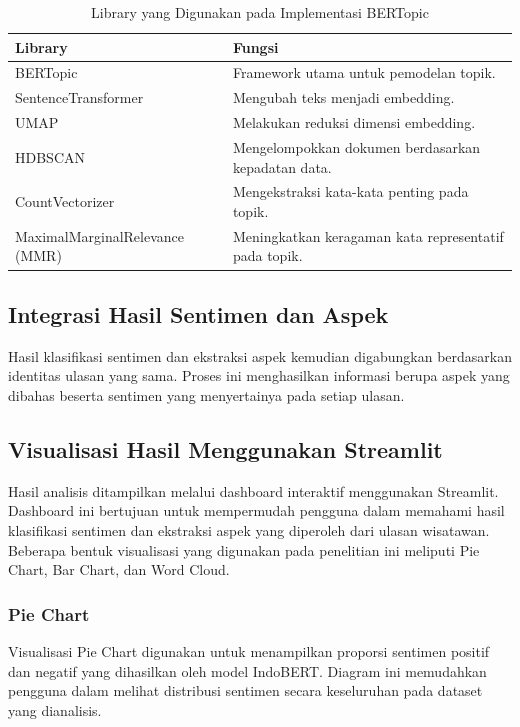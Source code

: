 \begin{table}[H]
\centering
\caption{Library yang Digunakan pada Implementasi BERTopic}
\begin{tabular}{|l|p{9cm}|}
\hline
\textbf{Library} & \textbf{Fungsi} \\
\hline
BERTopic & Framework utama untuk pemodelan topik. \\
\hline
SentenceTransformer & Mengubah teks menjadi embedding. \\
\hline
UMAP & Melakukan reduksi dimensi embedding. \\
\hline
HDBSCAN & Mengelompokkan dokumen berdasarkan kepadatan data. \\
\hline
CountVectorizer & Mengekstraksi kata-kata penting pada topik. \\
\hline
MaximalMarginalRelevance (MMR) & Meningkatkan keragaman kata representatif pada topik. \\
\hline
\end{tabular}
\end{table}

\subsection{Integrasi Hasil Sentimen dan Aspek}

Hasil klasifikasi sentimen dan ekstraksi aspek kemudian digabungkan berdasarkan identitas ulasan yang sama. Proses ini menghasilkan informasi berupa aspek yang dibahas beserta sentimen yang menyertainya pada setiap ulasan.

\subsection{Visualisasi Hasil Menggunakan Streamlit}

Hasil analisis ditampilkan melalui dashboard interaktif menggunakan Streamlit. Dashboard ini bertujuan untuk mempermudah pengguna dalam memahami hasil klasifikasi sentimen dan ekstraksi aspek yang diperoleh dari ulasan wisatawan. Beberapa bentuk visualisasi yang digunakan pada penelitian ini meliputi Pie Chart, Bar Chart, dan Word Cloud.

\subsubsection{Pie Chart}

Visualisasi Pie Chart digunakan untuk menampilkan proporsi sentimen positif dan negatif yang dihasilkan oleh model IndoBERT. Diagram ini memudahkan pengguna dalam melihat distribusi sentimen secara keseluruhan pada dataset yang dianalisis.


